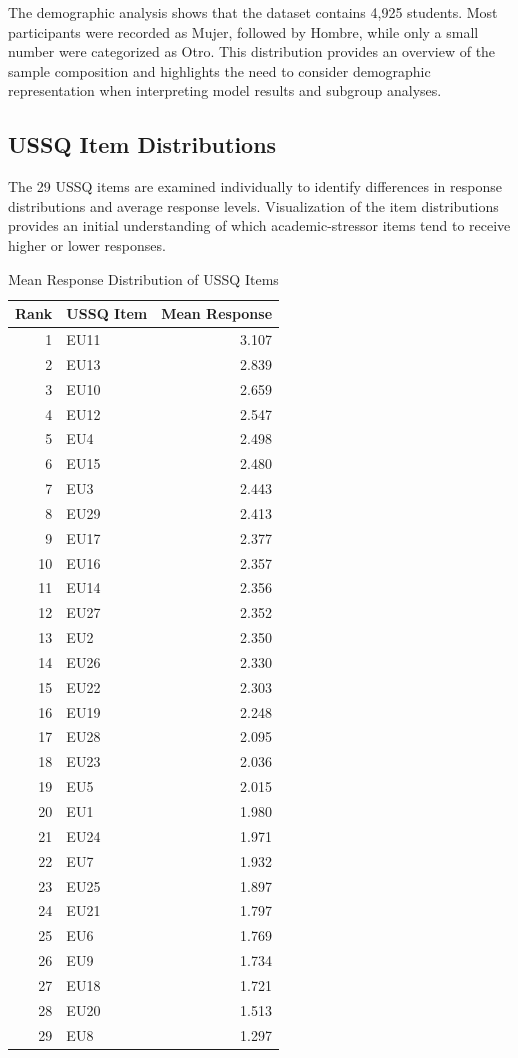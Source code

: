 \documentclass[conference]{IEEEtran}
\begin{document}
The demographic analysis shows that the dataset contains 4,925 students. Most participants were recorded as Mujer, followed by Hombre, while only a small number were categorized as Otro. This distribution provides an overview of the sample composition and highlights the need to consider demographic representation when interpreting model results and subgroup analyses.

\subsection{USSQ Item Distributions}

The 29 USSQ items are examined individually to identify differences in response distributions and average response levels. Visualization of the item distributions provides an initial understanding of which academic-stressor items tend to receive higher or lower responses.

\begin{table}[H]
\centering
\caption{Mean Response Distribution of USSQ Items}
\label{tab:ussq_means}
\begin{tabular}{r l r}
\toprule
\textbf{Rank} & \textbf{USSQ Item} & \textbf{Mean Response} \\
\midrule
1  & EU11 & 3.107 \\
2  & EU13 & 2.839 \\
3  & EU10 & 2.659 \\
4  & EU12 & 2.547 \\
5  & EU4  & 2.498 \\
6  & EU15 & 2.480 \\
7  & EU3  & 2.443 \\
8  & EU29 & 2.413 \\
9  & EU17 & 2.377 \\
10 & EU16 & 2.357 \\
11 & EU14 & 2.356 \\
12 & EU27 & 2.352 \\
13 & EU2  & 2.350 \\
14 & EU26 & 2.330 \\
15 & EU22 & 2.303 \\
16 & EU19 & 2.248 \\
17 & EU28 & 2.095 \\
18 & EU23 & 2.036 \\
19 & EU5  & 2.015 \\
20 & EU1  & 1.980 \\
21 & EU24 & 1.971 \\
22 & EU7  & 1.932 \\
23 & EU25 & 1.897 \\
24 & EU21 & 1.797 \\
25 & EU6  & 1.769 \\
26 & EU9  & 1.734 \\
27 & EU18 & 1.721 \\
28 & EU20 & 1.513 \\
29 & EU8  & 1.297 \\
\bottomrule
\end{tabular}
\end{table}
\end{document}
